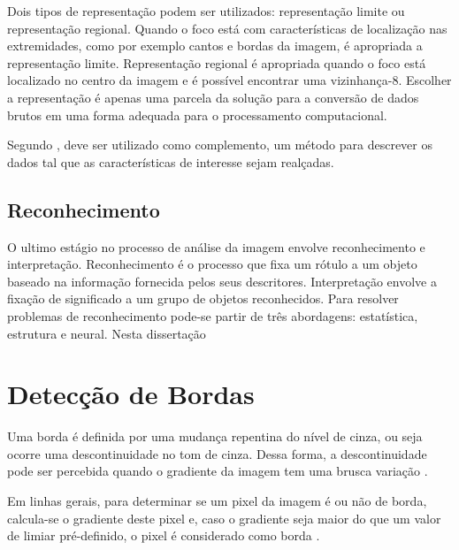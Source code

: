 Dois tipos de representação podem ser utilizados: representação limite ou representação regional. Quando o foco está com características de localização nas extremidades, como por exemplo cantos e bordas da imagem, é apropriada a representação limite. Representação regional é apropriada quando o foco está localizado no centro da imagem e é possível encontrar uma vizinhança-8. Escolher a representação é apenas uma parcela da solução para a conversão de dados brutos em uma forma adequada para o processamento computacional. \cite{Rodrigues2002}


Segundo , deve ser utilizado como complemento, um método para descrever os dados tal que as características de interesse sejam realçadas. %

\subsection{Reconhecimento}
O ultimo estágio no processo de análise da imagem envolve reconhecimento e interpretação. Reconhecimento é o processo que fixa um rótulo a um objeto baseado na informação fornecida pelos seus descritores. Interpretação envolve a fixação de significado a um grupo de objetos reconhecidos. Para resolver problemas de reconhecimento pode-se partir de três abordagens: estatística, estrutura e neural. Nesta dissertação %



\section{Detecção de Bordas}

Uma borda é definida por uma mudança repentina do nível de cinza, ou seja ocorre uma descontinuidade no tom de cinza. Dessa forma, a descontinuidade pode ser percebida quando o gradiente da imagem tem uma brusca variação \cite{Antonio}. 

Em linhas gerais, para determinar se um pixel da imagem é ou não de borda, calcula-se o gradiente deste pixel e, caso o gradiente seja maior do que um valor de limiar pré-definido, o pixel é considerado como borda \cite{Silva2001}.

